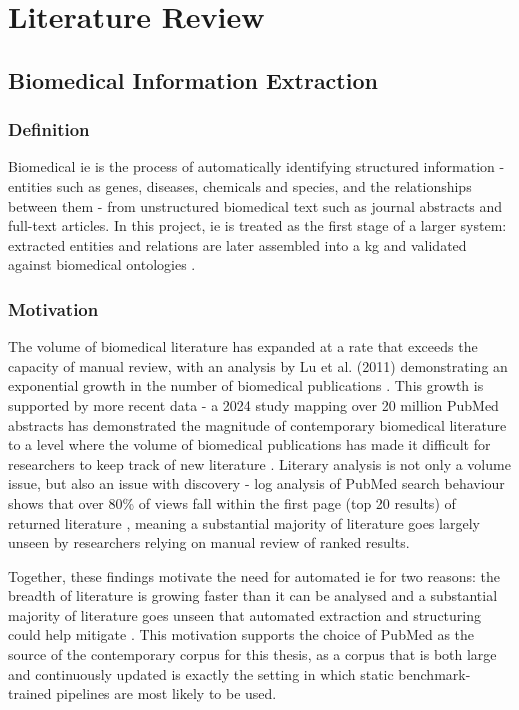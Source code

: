 \chapter{Literature Review}
\label{chap:lit_review}

\section{Biomedical Information Extraction}
\label{sec:lit:biomedical_ie}

\subsection{Definition}
\label{subsec:lit:definition}
Biomedical \gls{ie} is the process of automatically identifying structured information - entities such as genes, diseases, chemicals and species, and the relationships between them - from unstructured biomedical text such as journal abstracts and full-text articles. In this project, \gls{ie} is treated as the first stage of a larger system: extracted entities and relations are later assembled into a \gls{kg} and validated against biomedical ontologies \pref.

\subsection{Motivation}
\label{subsec:lit:motivation}
The volume of biomedical literature has expanded at a rate that exceeds the capacity of manual review, with an analysis by Lu et al. (2011) demonstrating an exponential growth in the number of biomedical publications \cite{lu2011_pubmed_publicationrate}. This growth is supported by more recent data - a 2024 study mapping over 20 million PubMed abstracts has demonstrated the magnitude of contemporary biomedical literature to a level where the volume of biomedical  publications has made it difficult for researchers to keep track of new literature \cite{gonzalez2024_biomed_landscape}. Literary analysis is not only a volume issue, but also an issue with discovery - log analysis of PubMed search behaviour shows that over 80\% of views fall within the first page (top 20 results) of returned literature \cite{islamaj2009_firstpage}, meaning a substantial majority of literature goes largely unseen by researchers relying on manual review of ranked results.

Together, these findings motivate the need for automated \gls{ie} for two reasons: the breadth of literature is growing faster than it can be analysed \cite{lu2011_pubmed_publicationrate,gonzalez2024_biomed_landscape} and a substantial majority of literature goes unseen that automated extraction and structuring could help mitigate \cite{islamaj2009_firstpage}. This motivation supports the choice of PubMed as the source of the contemporary corpus for this thesis, as a corpus that is both large and continuously updated is exactly the setting in which static benchmark-trained pipelines are most likely to be used.

